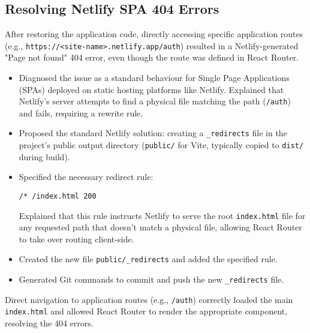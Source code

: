 \documentclass[11pt]{article} %
\begin{document}
\subsection{Resolving Netlify SPA 404 Errors}
\begin{description}[style=unboxed,leftmargin=0pt]
    \item[Problem:] After restoring the application code, directly accessing specific application routes (e.g., \texttt{https://<site-name>.netlify.app/auth}) resulted in a Netlify-generated "Page not found" 404 error, even though the route was defined in React Router.
    \item[AI Assistance (Diagnosis \& Solution):]
        \begin{itemize}
            \item Diagnosed the issue as a standard behaviour for Single Page Applications (SPAs) deployed on static hosting platforms like Netlify. Explained that Netlify's server attempts to find a physical file matching the path (\texttt{/auth}) and fails, requiring a rewrite rule.
            \item Proposed the standard Netlify solution: creating a \texttt{\_redirects} file in the project's public output directory (\texttt{public/} for Vite, typically copied to \texttt{dist/} during build).
            \item Specified the necessary redirect rule:
            \begin{verbatim}
/* /index.html 200
            \end{verbatim}
            Explained that this rule instructs Netlify to serve the root \texttt{index.html} file for any requested path that doesn't match a physical file, allowing React Router to take over routing client-side.
            \item Created the new file \texttt{public/\_redirects} and added the specified rule.
            \item Generated Git commands to commit and push the new \texttt{\_redirects} file.
        \end{itemize}
    \item[Outcome:] Direct navigation to application routes (e.g., \texttt{/auth}) correctly loaded the main \texttt{index.html} and allowed React Router to render the appropriate component, resolving the 404 errors.
\end{description}
\end{document}
